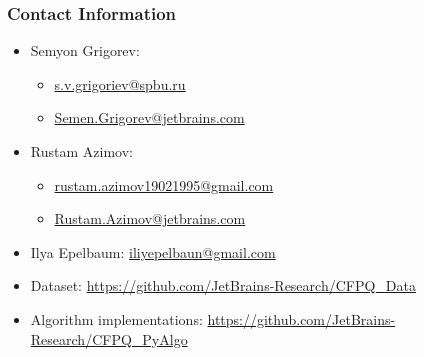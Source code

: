 \documentclass[xcolor=table,aspectratio=169]{beamer}
\begin{document}
\begin{frame}
\frametitle{Contact Information}
\begin{itemize}
  \item Semyon Grigorev:
    \begin{itemize}
      \item \href{mailto:s.v.grigoriev@spbu.ru}{s.v.grigoriev@spbu.ru}
      \item \href{mailto:Semen.Grigorev@jetbrains.com}{Semen.Grigorev@jetbrains.com}
    \end{itemize}
  \item Rustam Azimov:
  \begin{itemize}
  	\item \href{mailto:rustam.azimov19021995@gmail.com}{rustam.azimov19021995@gmail.com}
  	\item \href{mailto:Rustam.Azimov@jetbrains.com}{Rustam.Azimov@jetbrains.com}
  \end{itemize}
  \item Ilya Epelbaum: \href{mailto:iliyepelbaun@gmail.com}{iliyepelbaun@gmail.com}
\vspace{0.5cm}
  \item Dataset: \href{https://github.com/JetBrains-Research/CFPQ_Data}{https://github.com/JetBrains-Research/CFPQ\_Data}
   \item Algorithm implementations: \href{https://github.com/JetBrains-Research/CFPQ_PyAlgo}{https://github.com/JetBrains-Research/CFPQ\_PyAlgo}
\end{itemize}
\vspace{0.1cm}
\end{frame}
\end{document}
